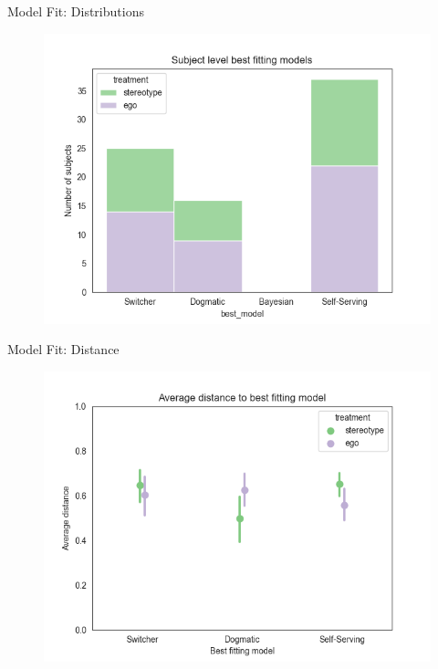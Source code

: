 \documentclass[aspectratio=169]{beamer}
\begin{document}
\begin{frame}{Model Fit: Distributions}

    \begin{figure}
        \centering
        \includegraphics[scale=.5]{model_fit_histogram.png}
    \end{figure}
    
\end{frame}

\begin{frame}{Model Fit: Distance}
    \label{meandistances}
    \begin{figure}
        \centering
        \includegraphics[scale=.5]{model_min_distance.png}
    \end{figure}

    
\end{frame}
\end{document}
